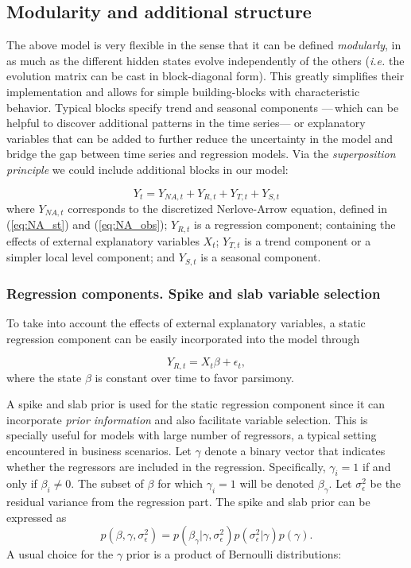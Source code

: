 \subsection{Modularity and additional structure}

The above model is very flexible in the sense that it can be defined \emph{modularly},  in as much as the different hidden states evolve independently of the others (\emph{i.e.} the evolution matrix can be cast in block-diagonal form). This greatly simplifies their implementation and allows for simple building-blocks with characteristic behavior. Typical blocks specify trend and seasonal components ---\,which can be helpful to discover additional patterns in the time series--- or explanatory variables that can be added to further reduce the uncertainty in the model and bridge the gap between time series and regression models. Via the \emph{superposition principle} \cite[Chapter 3]{petris2009dynamic} we could include additional blocks in our model:

$$
Y_t = Y_{NA, t} + Y_{R, t} + Y_{T, t} + Y_{S, t}
$$
where $Y_{NA, t}$ corresponds to the discretized Nerlove-Arrow equation, defined in (\ref{eq:NA_st}) and (\ref{eq:NA_obs}); $Y_{R, t}$ is a regression component; containing the effects of  external explanatory variables $X_t$; $Y_{T, t}$ is a trend component or a simpler local level component; and $Y_{S, t}$ is a seasonal component.

\subsubsection{Regression components. Spike and slab variable selection}\label{sec:s_s}

To take into account the effects of external explanatory variables, a static regression component can be easily incorporated into the model through

$$
Y_{R,t} = X_t \beta + \epsilon_t,
$$
where the state $\beta$ is constant over time to favor parsimony.

A spike and slab prior \cite{mitchell1988bayesian} is used for the static regression component since it can incorporate \emph{prior information} and also facilitate variable selection. This is specially useful for models with large number of regressors, a typical setting encountered in business scenarios.
Let $\gamma$ denote a binary vector that indicates whether the regressors are included in the regression. Specifically, $\gamma_i = 1$ if and only if $\beta_i \neq 0$. The subset of $\beta$ for which $\gamma_i = 1$ will be denoted $\beta_{\gamma}$. Let $\sigma^2_{\epsilon}$ be the residual variance from the regression part. The spike and slab prior \cite{george1997approaches} can be expressed as
$$
p(\beta, \gamma, \sigma^2_{\epsilon}) = p(\beta_{\gamma} | \gamma, \sigma^2_{\epsilon})p(\sigma^2_{\epsilon} | \gamma)p(\gamma).
$$
A usual choice for the $\gamma$ prior is a product of Bernoulli distributions:

